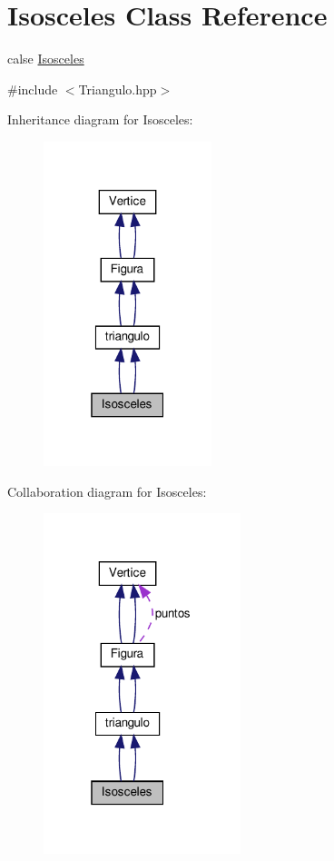 \hypertarget{class_isosceles}{}\section{Isosceles Class Reference}
\label{class_isosceles}


calse \hyperlink{class_isosceles}{Isosceles}  




{\ttfamily \#include $<$Triangulo.\+hpp$>$}



Inheritance diagram for Isosceles\+:
\nopagebreak
\begin{figure}[H]
\begin{center}
\leavevmode
\includegraphics[width=139pt]{class_isosceles__inherit__graph}
\end{center}
\end{figure}


Collaboration diagram for Isosceles\+:
\nopagebreak
\begin{figure}[H]
\begin{center}
\leavevmode
\includegraphics[width=163pt]{class_isosceles__coll__graph}
\end{center}
\end{figure}
